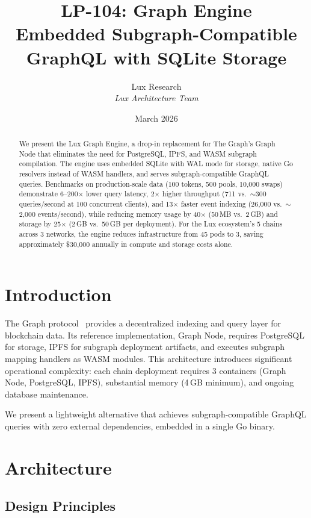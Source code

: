 \documentclass[11pt,a4paper]{article}
\title{LP-104: Graph Engine\\Embedded Subgraph-Compatible GraphQL with SQLite Storage}
\author{Lux Research \\
\textit{Lux Architecture Team}}
\date{March 2026}
\begin{document}
\luxcoverpage

\begin{abstract}
We present the Lux Graph Engine, a drop-in replacement for The Graph's Graph Node that eliminates
the need for PostgreSQL, IPFS, and WASM subgraph compilation. The engine uses embedded SQLite with
WAL mode for storage, native Go resolvers instead of WASM handlers, and serves subgraph-compatible
GraphQL queries. Benchmarks on production-scale data (100 tokens, 500 pools, 10{,}000 swaps)
demonstrate 6--200$\times$ lower query latency, 2$\times$ higher throughput (711 vs.\ $\sim$300
queries/second at 100 concurrent clients), and 13$\times$ faster event indexing (26{,}000 vs.\
$\sim$2{,}000 events/second), while reducing memory usage by 40$\times$ (50\,MB vs.\ 2\,GB)
and storage by 25$\times$ (2\,GB vs.\ 50\,GB per deployment). For the Lux ecosystem's 5 chains
across 3 networks, the engine reduces infrastructure from 45 pods to 3, saving approximately
\$30{,}000 annually in compute and storage costs alone.
\end{abstract}

\tableofcontents

\section{Introduction}

The Graph protocol~\cite{thegraph} provides a decentralized indexing and query layer for
blockchain data. Its reference implementation, Graph Node, requires PostgreSQL for storage,
IPFS for subgraph deployment artifacts, and executes subgraph mapping handlers as WASM modules.
This architecture introduces significant operational complexity: each chain deployment requires
3 containers (Graph Node, PostgreSQL, IPFS), substantial memory (4\,GB minimum), and ongoing
database maintenance.

We present a lightweight alternative that achieves subgraph-compatible GraphQL queries with
zero external dependencies, embedded in a single Go binary.

\section{Architecture}

\subsection{Design Principles}
\end{document}
